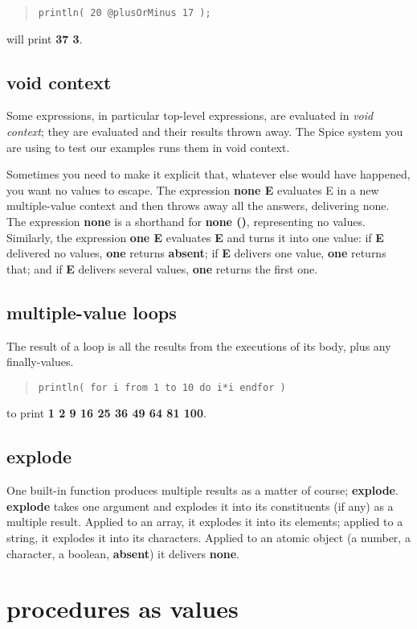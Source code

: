 \documentclass{report}
\begin{document}
\begin{quote}
\begin{verbatim}
println( 20 @plusOrMinus 17 );
\end{verbatim}
\end{quote}
will print {\bf 37 3}.

\section{void context}


Some expressions, in particular top-level expressions, are evaluated in {\em void
context}; they are evaluated and their results thrown away. The Spice system
you are using to test our examples runs them in void context.

Sometimes you need to make it explicit that, whatever else would have
happened, you want no values to escape. The expression {\bf none E} evaluates E in
a new multiple-value context and then throws away all the answers, delivering
none. The expression {\bf none} is a shorthand for {\bf none ()}, representing no
values. Similarly, the expression {\bf one E} evaluates {\bf E} and turns it into one
value: if {\bf E} delivered no values, {\bf one} returns {\bf absent}; if {\bf E} delivers one
value, {\bf one} returns that; and if {\bf E} delivers several values, {\bf one} returns
the first one.\section{multiple-value loops}


The result of a loop is all the results from the executions of its body,
plus any finally-values.

\begin{quote}
\begin{verbatim}
println( for i from 1 to 10 do i*i endfor )
\end{verbatim}
\end{quote}
to print {\bf 1 2 9 16 25 36 49 64 81 100}.\section{explode}


One built-in function produces multiple results as a matter of course;
{\bf explode}. {\bf explode} takes one argument and explodes it into its constituents
(if any) as a multiple result. Applied to an array, it explodes it into its
elements; applied to a string, it explodes it into its characters. Applied
to an atomic object (a number, a character, a boolean, {\bf absent}) it delivers
{\bf none}.\chapter{procedures as values}
\end{document}

